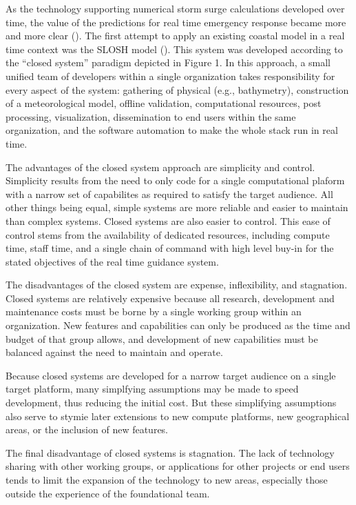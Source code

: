 \documentclass[12pt]{article}
\begin{document}
As the technology supporting numerical storm surge calculations 
developed over time, the value of the predictions for real time 
emergency response became more and more clear (\cite 
{JelesnianskiCP1992}). The first attempt to apply an existing 
coastal model in a real time context was the SLOSH model (\cite 
{JelesnianskiCP1992}). This system was developed according to the 
``closed system'' paradigm depicted in Figure 1. In this approach, a 
small unified team of developers within a single organization takes 
responsibility for every aspect of the system: gathering of physical 
(e.g., bathymetry), construction of a meteorological model, offline 
validation, computational resources, post processing, visualization, 
dissemination to end users within the same organization, and the 
software automation to make the whole stack run in real time. 

The advantages of the closed system approach are simplicity and 
control. Simplicity results from the need to only code for a single 
computational plaform with a narrow set of capabilites as required 
to satisfy the target audience. All other things being equal, simple 
systems are more reliable and easier to maintain than complex 
systems. Closed systems are also easier to control. This ease of 
control stems from the availability of dedicated resources, 
including compute time, staff time, and a single chain of command 
with high level buy-in for the stated objectives of the real time 
guidance system.

The disadvantages of the closed system are expense, inflexibility, 
and stagnation. Closed systems are relatively expensive because all 
research, development and maintenance costs must be borne by a 
single working group within an organization. New features and 
capabilities can only be produced as the time and budget of that 
group allows, and development of new capabilities must be balanced 
against the need to maintain and operate.

Because closed systems are developed for a narrow target audience on 
a single target platform, many simplfying assumptions may be made to 
speed development, thus reducing the initial cost. But these 
simplifying assumptions also serve to stymie later extensions to new 
compute platforms, new geographical areas, or the inclusion of new 
features. 

The final disadvantage of closed systems is stagnation. The lack of 
technology sharing with other working groups, or applications for 
other projects or end users tends to limit the expansion of the 
technology to new areas, especially those outside the experience of 
the foundational team. 
\end{document}
